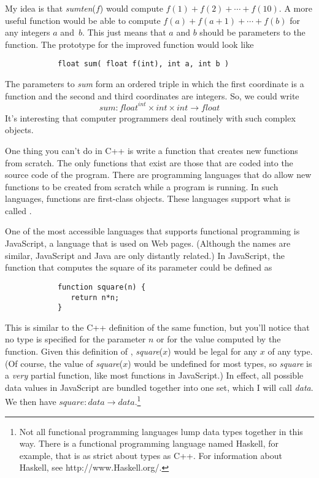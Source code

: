 My idea is that \textit{sumten}($f$) would compute
$f(1)+f(2)+\cdots+f(10)$.  A more useful function would
be able to compute $f(a)+f(a+1)+\cdots+f(b)$ for any integers
$a$ and~$b$.  This just means that $a$ and $b$ should be
parameters to the function.  The prototype for the improved
function would look like
\begin{verbatim}
            float sum( float f(int), int a, int b )
\end{verbatim}
The parameters to \textit{sum} form an ordered triple in which
the first coordinate is a function and the second and third
coordinates are integers.  So, we could write
\[\textit{sum}\colon \textit{float}^{\textit{int}}
       \times\textit{int}\times\textit{int}\to\textit{float}\]
It's interesting that computer programmers deal routinely
with such complex objects.

\medskip

One thing you can't do in C++ is write a function that creates
new functions from scratch.  The only functions that exist
are those that are coded into the source code of the program.
There are programming languages that do allow new functions to
be created from scratch while a program is running.  In such
languages, functions are first-class objects.  These languages
support what is called .  

One of the most accessible languages that supports functional programming
is JavaScript, a language that is used on Web pages.  (Although
the names are similar, JavaScript and Java are only distantly
related.)  In JavaScript, the function that computes the
square of its parameter could be defined as
\begin{verbatim}
            function square(n) {
               return n*n;
            }
\end{verbatim}
This is similar to the C++ definition of the same function, but
you'll notice that no type is specified for the parameter $n$ or
for the value computed by the function.  Given this definition
of , \textit{square}($x$) would be legal for any
$x$ of any type.  (Of course, the value of \textit{square}($x$)
would be undefined for most types, so \textit{square} is
a \emph{very} partial function, like most functions in JavaScript.)
In effect, all possible data values in JavaScript are bundled
together into one set, which I will call \textit{data}.
We then have $\textit{square}\colon \textit{data}\to \textit{data}$.\footnote{Not
all functional programming languages lump data types together
in this way.  There is a functional programming language
named Haskell, for example, that is as strict about types as C++.
For information about Haskell, see http://www.Haskell.org/.}

